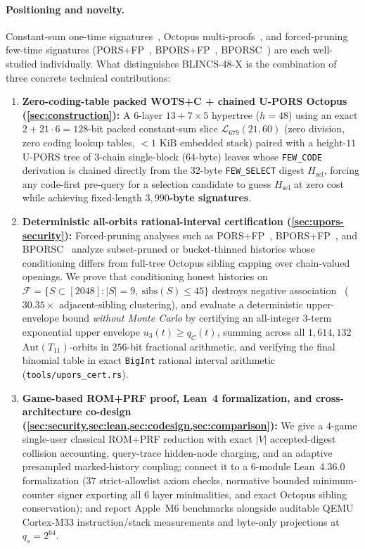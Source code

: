 \documentclass[11pt,a4paper]{article}
\theoremstyle{definition}
\theoremstyle{remark}
\newcommand{\BLINCS}{\textsf{BLINCS-48-X}}
\newcommand{\WOTSC}{\textsf{WOTS+C}}
\newcommand{\UPORS}{\textsf{U-PORS}}
\newcommand{\calF}{\mathcal{F}}
\newcommand{\calC}{\mathcal{C}}
\newcommand{\calL}{\mathcal{L}}
\begin{document}
\paragraph{Positioning and novelty.}
Constant-sum one-time signatures~\cite{bos1992csum,kudinov2022wotsplusc,zhang2023csum,khovratovich2025hypercube}, Octopus multi-proofs~\cite{aumasson2017gravity}, and forced-pruning few-time signatures (\textsf{PORS+FP}~\cite{abri2025porsfp}, \textsf{BPORS+FP}~\cite{ren2026bporsfp}, \textsf{BPORSC}~\cite{wang2026bporsc}) are each well-studied individually. What distinguishes \BLINCS{} is the combination of three concrete technical contributions:
\begin{enumerate}[leftmargin=1.4em,itemsep=2pt]
  \item \textbf{Zero-coding-table packed \WOTSC{} + chained \UPORS{} Octopus (\cref{sec:construction}):}
    A $6$-layer $13{+}7{\times}5$ hypertree ($h = 48$) using an exact $2 + 21 \cdot 6 = 128$-bit packed constant-sum slice $\calL_{679}(21, 60)$ (zero division, zero coding lookup tables, $< 1\text{ KiB}$ embedded stack) paired with a height-$11$ \UPORS{} tree of $3$-chain single-block ($64$-byte) leaves whose \texttt{FEW\_CODE} derivation is chained directly from the $32$-byte \texttt{FEW\_SELECT} digest $H_{\mathrm{sel}}$, forcing any code-first pre-query for a selection candidate to guess $H_{\mathrm{sel}}$ at zero cost while achieving fixed-length \textbf{$3{,}990$-byte signatures}.
  \item \textbf{Deterministic all-orbits rational-interval certification (\cref{sec:upors-security}):}
    Forced-pruning analyses such as \textsf{PORS+FP}~\cite{abri2025porsfp}, \textsf{BPORS+FP}~\cite{ren2026bporsfp}, and \textsf{BPORSC}~\cite{wang2026bporsc} analyze subset-pruned or bucket-thinned histories whose conditioning differs from full-tree Octopus sibling capping over chain-valued openings. We prove that conditioning honest histories on $\calF = \{S \subset [2048] : |S| = 9,\ \mathrm{sibs}(S) \le 45\}$ destroys negative association~\cite{joagdev1983na} ($30.35\times$ adjacent-sibling clustering), and evaluate a deterministic upper-envelope bound \emph{without Monte Carlo} by certifying an all-integer $3$-term exponential upper envelope $u_3(t) \ge q_\calC(t)$, summing across all $1{,}614{,}132$ $\mathrm{Aut}(T_{11})$-orbits in $256$-bit fractional arithmetic, and verifying the final binomial table in exact \texttt{BigInt} rational interval arithmetic (\texttt{tools/upors\_cert.rs}).
  \item \textbf{Game-based ROM+PRF proof, Lean~4 formalization, and cross-architecture co-design (\cref{sec:security,sec:lean,sec:codesign,sec:comparison}):}
    We give a $4$-game single-user classical ROM+PRF reduction with exact $|V|$ accepted-digest collision accounting, query-trace hidden-node charging, and an adaptive presampled marked-history coupling; connect it to a $6$-module Lean~4.36.0 formalization ($37$ strict-allowlist axiom checks, normative bounded minimum-counter signer exporting all $6$ layer minimalities, and exact Octopus sibling conservation); and report Apple~M6 benchmarks alongside auditable QEMU Cortex-M33 instruction/stack measurements and byte-only projections at $q_s = 2^{64}$.
\end{enumerate}
\end{document}
